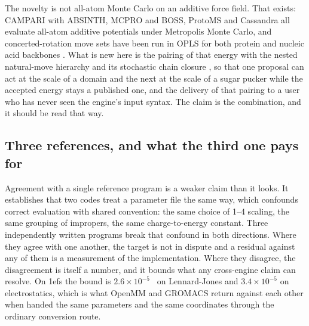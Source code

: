 The novelty is not all-atom Monte Carlo on an additive force field. That
exists: CAMPARI with ABSINTH, MCPRO and BOSS, ProtoMS and Cassandra all evaluate
all-atom additive potentials under Metropolis Monte Carlo, and concerted-rotation
move sets have been run in OPLS for both protein and nucleic acid backbones
\cite{ulmschneider2003concerted,ulmschneider2004concertedna,vitalis2009mcmethods}.
What is new here is the pairing of that energy with the nested natural-move
hierarchy and its stochastic chain closure
\cite{minary2010chainclosure,sim2012naturalmoves}, so that one proposal can act
at the scale of a domain and the next at the scale of a sugar pucker while the
accepted energy stays a published one, and the delivery of that pairing to a
user who has never seen the engine's input syntax. The claim is the combination,
and it should be read that way.

\subsection{Three references, and what the third one pays for}
\label{sec:threerefs}

Agreement with a single reference program is a weaker claim than it looks. It
establishes that two codes treat a parameter file the same way, which confounds
correct evaluation with shared convention: the same choice of 1--4 scaling, the
same grouping of impropers, the same charge-to-energy constant. Three
independently written programs break that confound in both directions. Where
they agree with one another, the target is not in dispute and a residual
against any of them is a measurement of the implementation. Where they
disagree, the disagreement is itself a number, and it bounds what any
cross-engine claim can resolve. On 1efs the bound is $2.6\times10^{-5}$~\kcal{}
on Lennard-Jones and $3.4\times10^{-5}$ on electrostatics, which is what OpenMM
and GROMACS return against each other when handed the same parameters and the
same coordinates through the ordinary conversion route.

